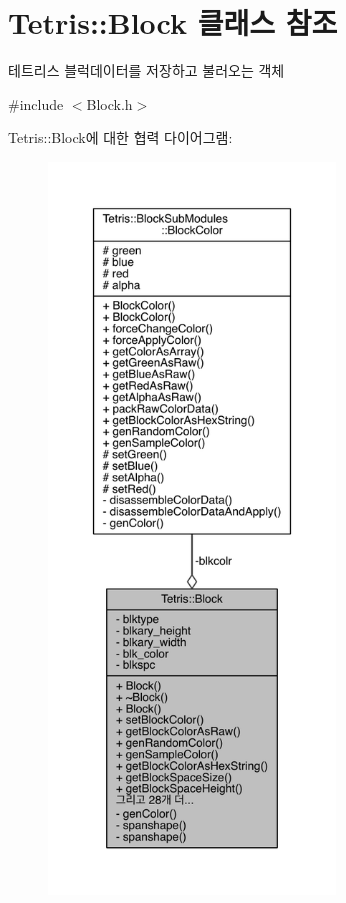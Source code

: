 \hypertarget{class_tetris_1_1_block}{}\section{Tetris\+:\+:Block 클래스 참조}
\label{class_tetris_1_1_block}


테트리스 블럭데이터를 저장하고 불러오는 객체  




{\ttfamily \#include $<$Block.\+h$>$}



Tetris\+:\+:Block에 대한 협력 다이어그램\+:
\nopagebreak
\begin{figure}[H]
\begin{center}
\leavevmode
\includegraphics[height=550pt]{d9/d68/class_tetris_1_1_block__coll__graph}
\end{center}
\end{figure}
